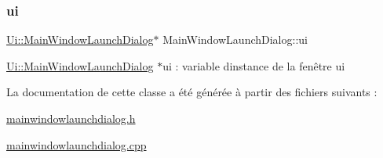 \subsubsection{\texorpdfstring{ui}{ui}}
{\footnotesize\ttfamily \hyperlink{classUi_1_1MainWindowLaunchDialog}{Ui\+::\+Main\+Window\+Launch\+Dialog}$\ast$ Main\+Window\+Launch\+Dialog\+::ui\hspace{0.3cm}{\ttfamily [private]}}

\hyperlink{classUi_1_1MainWindowLaunchDialog}{Ui\+::\+Main\+Window\+Launch\+Dialog} $\ast$ui \+: variable d\textquotesingle{}instance de la fenêtre ui 

La documentation de cette classe a été générée à partir des fichiers suivants \+:\begin{DoxyCompactItemize}
\item 
\hyperlink{mainwindowlaunchdialog_8h}{mainwindowlaunchdialog.\+h}\item 
\hyperlink{mainwindowlaunchdialog_8cpp}{mainwindowlaunchdialog.\+cpp}\end{DoxyCompactItemize}

